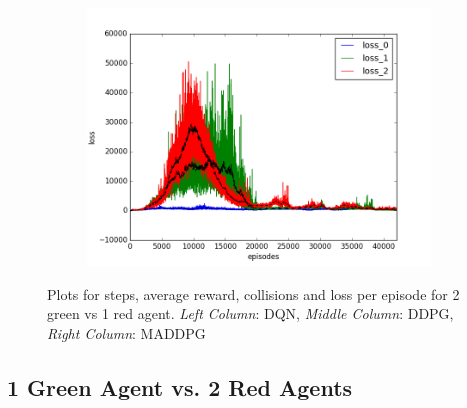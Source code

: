 \begin{figure}[t]
\begin{subfigure}[t]{\figscale\linewidth}
    \includegraphics[width=1.5\textwidth]
    {../results/maddpg_1vs2/loss.png}
    \label{fig:maddpg-1vs2-loss}
  \end{subfigure}

  \caption{Plots for steps, average reward, collisions and loss per episode for 2 green vs 1 red agent. \textit{Left Column}: DQN, \textit{Middle Column}: DDPG, \textit{Right Column}: MADDPG}
  \label{fig:1vs2}
\end{figure}
\FloatBarrier

\subsection{1 Green Agent vs. 2 Red Agents}
\label{sec:experiment:2vs1}

